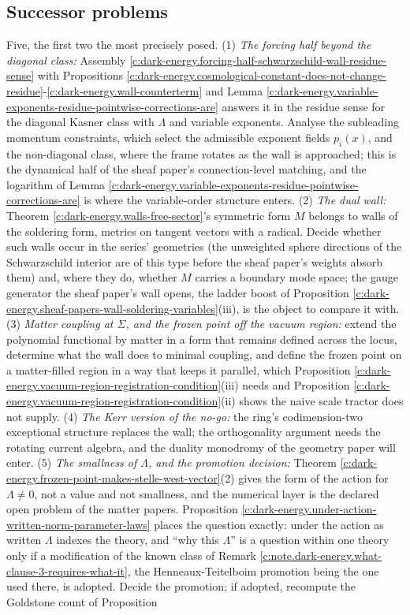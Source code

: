\documentclass[11pt]{article}
\theoremstyle{definition}
\theoremstyle{plain}
\begin{document}
\subsection*{Successor problems}
\label{c:note.dark-energy.setting-successor-problems}
Five, the first two the most precisely posed. (1) \emph{The forcing half beyond the diagonal class:} Assembly \ref{c:dark-energy.forcing-half-schwarzschild-wall-residue-sense} with Propositions \ref{c:dark-energy.cosmological-constant-does-not-change-residue}-\ref{c:dark-energy.wall-counterterm} and Lemma \ref{c:dark-energy.variable-exponents-residue-pointwise-corrections-are} answers it in the residue sense for the diagonal Kasner class with $\Lambda$ and variable exponents. Analyse the subleading momentum constraints, which select the admissible exponent fields $p_i(x)$, and the non-diagonal class, where the frame rotates as the wall is approached; this is the dynamical half of the sheaf paper's connection-level matching, and the logarithm of Lemma \ref{c:dark-energy.variable-exponents-residue-pointwise-corrections-are} is where the variable-order structure enters. (2) \emph{The dual wall:} Theorem \ref{c:dark-energy.walls-free-sector}'s symmetric form $M$ belongs to walls of the soldering form, metrics on tangent vectors with a radical. Decide whether such walls occur in the series' geometries (the unweighted sphere directions of the Schwarzschild interior are of this type before the sheaf paper's weights absorb them) and, where they do, whether $M$ carries a boundary mode space; the gauge generator the sheaf paper's wall opens, the ladder boost of Proposition \ref{c:dark-energy.sheaf-papers-wall-soldering-variables}(iii), is the object to compare it with. (3) \emph{Matter coupling at $\Sigma$, and the frozen point off the vacuum region:} extend the polynomial functional by matter in a form that remains defined across the locus, determine what the wall does to minimal coupling, and define the frozen point on a matter-filled region in a way that keeps it parallel, which Proposition \ref{c:dark-energy.vacuum-region-registration-condition}(iii) needs and Proposition \ref{c:dark-energy.vacuum-region-registration-condition}(ii) shows the naive scale tractor does not supply. (4) \emph{The Kerr version of the no-go:} the ring's codimension-two exceptional structure replaces the wall; the orthogonality argument needs the rotating current algebra, and the duality monodromy of the geometry paper will enter. (5) \emph{The smallness of $\Lambda$, and the promotion decision:} Theorem \ref{c:dark-energy.frozen-point-makes-stelle-west-vector}(2) gives the form of the action for $\Lambda \neq 0$, not a value and not smallness, and the numerical layer is the declared open problem of the matter papers. Proposition \ref{c:dark-energy.under-action-written-norm-parameter-laws} places the question exactly: under the action as written $\Lambda$ indexes the theory, and ``why this $\Lambda$'' is a question within one theory only if a modification of the known class of Remark \ref{c:note.dark-energy.what-clause-3-requires-what-it}, the Henneaux-Teitelboim promotion being the one used there, is adopted. Decide the promotion; if adopted, recompute the Goldstone count of Proposition 
\end{document}
